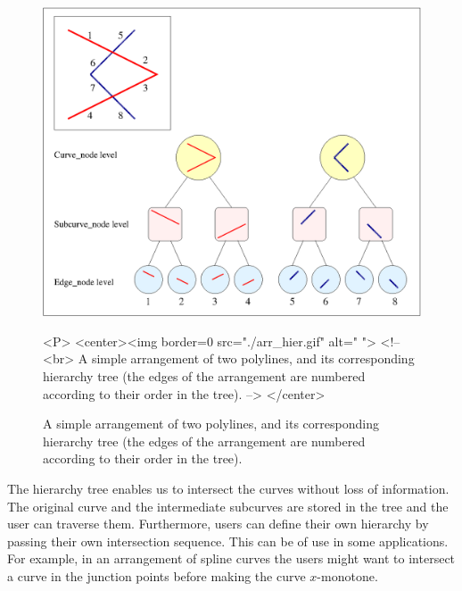 \begin{figure}
\begin{ccTexOnly}
{\centerline {\includegraphics{arr_hier.ps}}}
\end{ccTexOnly}
\caption{A simple arrangement of two polylines, and its corresponding
hierarchy tree (the edges of the arrangement are numbered according to
their order in the tree).\label{fig:hierarchy}}
\begin{ccHtmlOnly}
<P>
<center><img border=0 src="./arr_hier.gif" alt=" ">
<!--
<br>
A simple arrangement of two polylines, and its corresponding hierarchy tree
(the edges of the arrangement are numbered according to their order
in the tree).
-->
</center>
\end{ccHtmlOnly}
\end{figure}

The hierarchy tree enables us to intersect the curves without loss of
information. The original curve and the intermediate subcurves are stored
in the tree and the user can traverse them. Furthermore, users can
define their own hierarchy by passing their own intersection sequence.
This can be of use in some applications. For example, in an arrangement
of spline curves the users might want to intersect a curve in the
junction points before making the curve $x$-monotone. 

